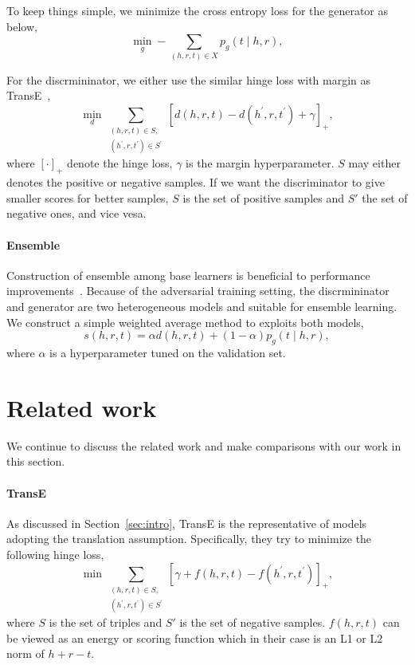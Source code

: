 \documentclass[twocolumn,a4paper,10pt,review,5p]{elsarticle}
\begin{document}
To keep things simple, we minimize the cross entropy loss for the generator as below,
\[
    \min_g -\sum_{(h, r, t)\in X} p_g(t \mid h, r),
\]

For the discrmininator, we either use the similar hinge loss with margin as TransE~\cite{TransE2013},
\[
    \min_d \sum_{\substack{(h, r, t)\in S,\\ (h^\prime, r, t^\prime)\in S^\prime }}
        {[ d(h, r, t) - d(h^\prime, r, t^\prime) + \gamma ]}_+,
\]
where ${[\cdot]}_+$ denote the hinge loss, $\gamma$ is the margin hyperparameter. $S$ may either denotes the positive or negative samples. If we want the discriminator to give smaller scores for better samples, $S$ is the set of positive samples and $S'$ the set of negative ones, and vice vesa.

\paragraph{Ensemble} Construction of ensemble among base learners is beneficial to performance improvements~\cite{dietterich2000ensemble}. Because of the adversarial training setting, the discrmininator and generator are two heterogeneous models and suitable for ensemble learning. We construct a simple weighted average method to exploits both models,
\[
    s(h, r, t) = \alpha d(h, r, t) + (1 - \alpha) p_g(t \mid h, r),
\]
where $\alpha$ is a hyperparameter tuned on the validation set.


\section{Related work}

We continue to discuss the related work and make comparisons with our work in this section.

\paragraph{TransE} As discussed in Section~\ref{sec:intro}, TransE is the representative of models adopting the translation assumption. Specifically, they try to minimize the following hinge loss,
\[
    \min\sum_{\substack{(h, r, t)\in S,\\ (h^\prime, r, t^\prime)\in S^\prime }}
        {\left[\gamma + f(h, r, t) - f(h^\prime, r, t^\prime)\right]}_+,
\]
where $S$ is the set of triples and $S'$ is the set of negative samples. $f(h, r, t)$ can be viewed as an energy or scoring function which in their case is an L1 or L2 norm of $h + r - t$.
\end{document}
